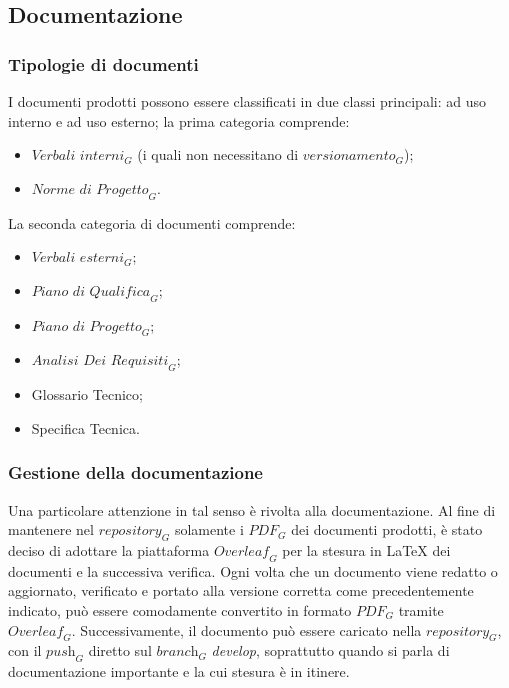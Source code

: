\subsection{Documentazione}


\subsubsection{Tipologie di documenti}
I documenti prodotti possono essere classificati in due classi principali: ad uso interno e ad uso esterno; la prima categoria comprende:
\begin{itemize}
    \item $\textit{Verbali interni}_G$ (i quali non necessitano di $\textit{versionamento}_G$);
    \item $\textit{Norme di Progetto}_G$.
\end{itemize}
La seconda categoria di documenti comprende:
\begin{itemize}
    \item $\textit{Verbali esterni}_G$;
    \item $\textit{Piano di Qualifica}_G$;
    \item $\textit{Piano di Progetto}_G$;
    \item $\textit{Analisi Dei Requisiti}_G$;
    \item Glossario Tecnico;
    \item Specifica Tecnica.
\end{itemize}
\subsubsection{Gestione della documentazione}
Una particolare attenzione in tal senso è rivolta alla documentazione. Al fine di mantenere nel $\textit{repository}_G$ solamente i $\textit{PDF}_G$ dei documenti prodotti, è stato deciso di adottare la piattaforma \href{https://www.overleaf.com/project}{$\textit{Overleaf}_G$} per la stesura in LaTeX dei documenti e la successiva verifica. Ogni volta che un documento viene redatto o aggiornato, verificato e portato alla versione corretta come precedentemente indicato, può essere comodamente convertito in formato $\textit{PDF}_G$ tramite $\textit{Overleaf}_G$. Successivamente, il documento può essere caricato nella $\textit{repository}_G$, con il $\textit{push}_G$ diretto sul $\textit{branch}_G$ \textit{develop}, soprattutto quando si parla di documentazione importante e la cui stesura è in itinere.

